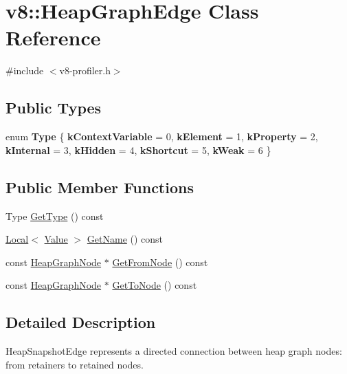\hypertarget{classv8_1_1HeapGraphEdge}{}\section{v8\+:\+:Heap\+Graph\+Edge Class Reference}
\label{classv8_1_1HeapGraphEdge}


{\ttfamily \#include $<$v8-\/profiler.\+h$>$}

\subsection*{Public Types}
\begin{DoxyCompactItemize}
\item 
\mbox{\label{classv8_1_1HeapGraphEdge_a252500cf4307fe9e4fcb0335a907259b}} 
enum {\bfseries Type} \{ \newline
{\bfseries k\+Context\+Variable} = 0, 
{\bfseries k\+Element} = 1, 
{\bfseries k\+Property} = 2, 
{\bfseries k\+Internal} = 3, 
\newline
{\bfseries k\+Hidden} = 4, 
{\bfseries k\+Shortcut} = 5, 
{\bfseries k\+Weak} = 6
 \}
\end{DoxyCompactItemize}
\subsection*{Public Member Functions}
\begin{DoxyCompactItemize}
\item 
Type \mbox{\hyperlink{classv8_1_1HeapGraphEdge_a7d784f0b7a5bf532e9d4ec86bcb94092}{Get\+Type}} () const
\item 
\mbox{\hyperlink{classv8_1_1Local}{Local}}$<$ \mbox{\hyperlink{classv8_1_1Value}{Value}} $>$ \mbox{\hyperlink{classv8_1_1HeapGraphEdge_a05c82a383b42324b73506abc4c82f584}{Get\+Name}} () const
\item 
const \mbox{\hyperlink{classv8_1_1HeapGraphNode}{Heap\+Graph\+Node}} $\ast$ \mbox{\hyperlink{classv8_1_1HeapGraphEdge_a2d730f01c04209726ee3d35524e66113}{Get\+From\+Node}} () const
\item 
const \mbox{\hyperlink{classv8_1_1HeapGraphNode}{Heap\+Graph\+Node}} $\ast$ \mbox{\hyperlink{classv8_1_1HeapGraphEdge_a7db892a422357ca83d9803b923e30452}{Get\+To\+Node}} () const
\end{DoxyCompactItemize}


\subsection{Detailed Description}
Heap\+Snapshot\+Edge represents a directed connection between heap graph nodes\+: from retainers to retained nodes. 

